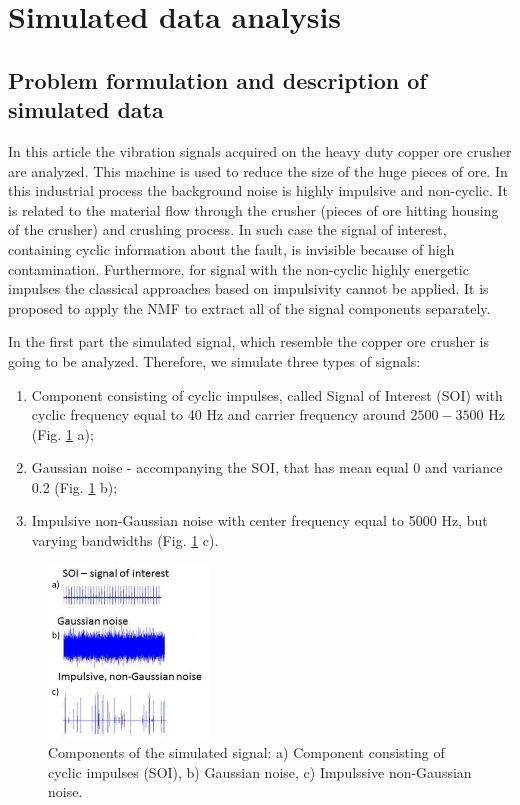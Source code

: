 \documentclass[journal]{IEEEtran}
\begin{document}
\section{Simulated data analysis}
\label{sec:sim data}
\subsection{Problem formulation and description of simulated data}
In this article the vibration signals acquired on the heavy duty copper ore crusher are analyzed. This machine is used to reduce the size of the huge pieces of ore. In this industrial process the background noise is highly impulsive and non-cyclic. It is related to the material flow through the crusher (pieces of ore hitting housing of the crusher) and crushing process. In such case the signal of interest, containing cyclic information about the fault, is invisible  because of high contamination. Furthermore, for signal with the non-cyclic highly energetic impulses the classical approaches based on impulsivity cannot be applied. It is proposed to apply the NMF to extract all of the signal components separately.

In the first part the simulated signal, which resemble the copper ore crusher is going to be analyzed. Therefore, we simulate three types of signals:

\begin{enumerate}
    \item Component consisting of cyclic impulses, called Signal of Interest (SOI) with cyclic frequency equal to 40 Hz and carrier frequency around $2500-3500$ Hz (Fig. \ref{fig:schemat sygnal} a);
    \item Gaussian noise - accompanying the SOI, that has mean equal 0 and variance 0.2 (Fig. \ref{fig:schemat sygnal} b);
    \item Impulsive non-Gaussian noise with center frequency equal to 5000 Hz, but varying bandwidths (Fig. \ref{fig:schemat sygnal} c).
\end{enumerate}

\begin{figure}[ht!]
    \centering
    \includegraphics[width = 0.38\textwidth]{figs3/sym_signal_components.png}
     \caption{ Components of the simulated signal: a) Component consisting of cyclic impulses (SOI), b) Gaussian noise, c) Impulssive non-Gaussian noise.}
    \label{fig:schemat sygnal}
\end{figure}
\end{document}
